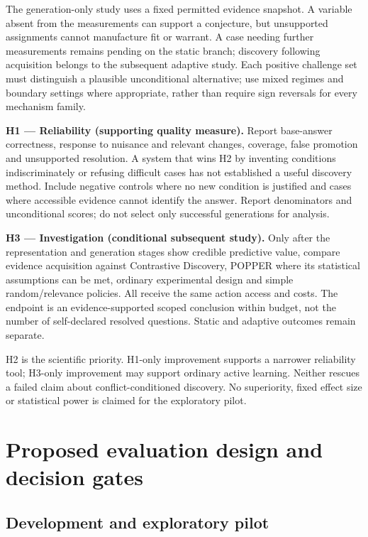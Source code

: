 \documentclass[11pt,a4paper]{article}
\begin{document}
The generation-only study uses a fixed permitted evidence snapshot. A
variable absent from the measurements can support a conjecture, but
unsupported assignments cannot manufacture fit or warrant. A case
needing further measurements remains pending on the static branch;
discovery following acquisition belongs to the subsequent adaptive
study. Each positive challenge set must distinguish a plausible
unconditional alternative; use mixed regimes and boundary settings where
appropriate, rather than require sign reversals for every mechanism
family.

\textbf{H1 --- Reliability (supporting quality measure).} Report
base-answer correctness, response to nuisance and relevant changes,
coverage, false promotion and unsupported resolution. A system that wins
H2 by inventing conditions indiscriminately or refusing difficult cases
has not established a useful discovery method. Include negative controls
where no new condition is justified and cases where accessible evidence
cannot identify the answer. Report denominators and unconditional
scores; do not select only successful generations for analysis.

\textbf{H3 --- Investigation (conditional subsequent study).} Only after
the representation and generation stages show credible predictive value,
compare evidence acquisition against Contrastive Discovery, POPPER where
its statistical assumptions can be met, ordinary experimental design and
simple random/relevance policies. All receive the same action access and
costs. The endpoint is an evidence-supported scoped conclusion within
budget, not the number of self-declared resolved questions. Static and
adaptive outcomes remain separate.

H2 is the scientific priority. H1-only improvement supports a narrower
reliability tool; H3-only improvement may support ordinary active
learning. Neither rescues a failed claim about conflict-conditioned
discovery. No superiority, fixed effect size or statistical power is
claimed for the exploratory pilot.

\section{Proposed evaluation design and decision
gates}\label{proposed-evaluation-design-and-decision-gates}

\subsection{Development and exploratory
pilot}\label{development-and-exploratory-pilot}
\end{document}
